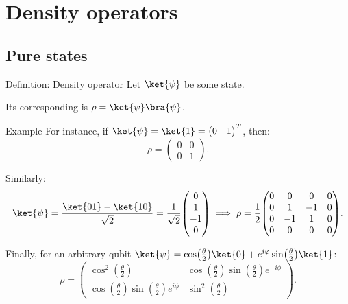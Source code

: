 \documentclass[a4paper]{article}
\begin{document}
\section{Density operators}

\subsection{Pure states}


\begin{parag}{Definition: Density operator}
    Let $\ket{\psi}$ be some state.

    Its corresponding  is $\rho = \ket{\psi}\bra{\psi}$.

    \begin{subparag}{Example}
        For instance, if $\ket{\psi} = \ket{1} = \begin{pmatrix} 0 & 1 \end{pmatrix}^T$, then: 
        \[\rho = \begin{pmatrix} 0 & 0 \\ 0 & 1 \end{pmatrix}.\]

        Similarly:
        \[\ket{\psi} = \frac{\ket{01} - \ket{10}}{\sqrt{2}} = \frac{1}{\sqrt{2}}\begin{pmatrix} 0 \\ 1 \\ -1 \\ 0 \end{pmatrix} \implies \rho = \frac{1}{2}\begin{pmatrix} 0 & 0 & 0 & 0 \\ 0 & 1 & -1 & 0 \\ 0 & -1 & 1 & 0 \\ 0 & 0 & 0 & 0 \end{pmatrix} .\]

        Finally, for an arbitrary qubit $\ket{\psi} = \cos\left(\frac{\theta}{2}\right) \ket{0} + e^{i \phi} \sin\left(\frac{\theta}{2}\right) \ket{1}$:
        \[\rho = \begin{pmatrix} \cos^2\left(\frac{\theta}{2}\right) & \cos\left(\frac{\theta}{2}\right) \sin\left(\frac{\theta}{2}\right) e^{-i \phi} \\ \cos\left(\frac{\theta}{2}\right)\sin\left(\frac{\theta}{2}\right) e^{i \phi} & \sin^2\left(\frac{\theta}{2}\right) \end{pmatrix} .\]
    \end{subparag}
\end{parag}
\end{document}
